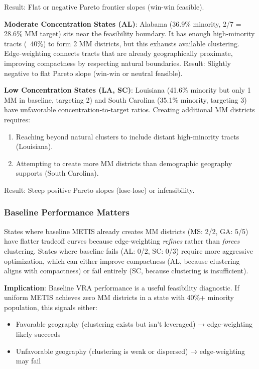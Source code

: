 Result: Flat or negative Pareto frontier slopes (win-win feasible).

\textbf{Moderate Concentration States (AL)}: Alabama (36.9\% minority, 2/7 = 28.6\% MM target) sits near the feasibility boundary. It has enough high-minority tracts (~40\%) to form 2 MM districts, but this exhausts available clustering. Edge-weighting connects tracts that are already geographically proximate, improving compactness by respecting natural boundaries. Result: Slightly negative to flat Pareto slope (win-win or neutral feasible).

\textbf{Low Concentration States (LA, SC)}: Louisiana (41.6\% minority but only 1 MM in baseline, targeting 2) and South Carolina (35.1\% minority, targeting 3) have unfavorable concentration-to-target ratios. Creating additional MM districts requires:
\begin{enumerate}
    \item Reaching beyond natural clusters to include distant high-minority tracts (Louisiana).
    \item Attempting to create more MM districts than demographic geography supports (South Carolina).
\end{enumerate}

Result: Steep positive Pareto slopes (lose-lose) or infeasibility.

\subsubsection{Baseline Performance Matters}

States where baseline METIS already creates MM districts (MS: 2/2, GA: 5/5) have flatter tradeoff curves because edge-weighting \emph{refines} rather than \emph{forces} clustering. States where baseline fails (AL: 0/2, SC: 0/3) require more aggressive optimization, which can either improve compactness (AL, because clustering aligns with compactness) or fail entirely (SC, because clustering is insufficient).

\textbf{Implication}: Baseline VRA performance is a useful feasibility diagnostic. If uniform METIS achieves zero MM districts in a state with 40\%+ minority population, this signals either:
\begin{itemize}
    \item Favorable geography (clustering exists but isn't leveraged) → edge-weighting likely succeeds
    \item Unfavorable geography (clustering is weak or dispersed) → edge-weighting may fail
\end{itemize}

